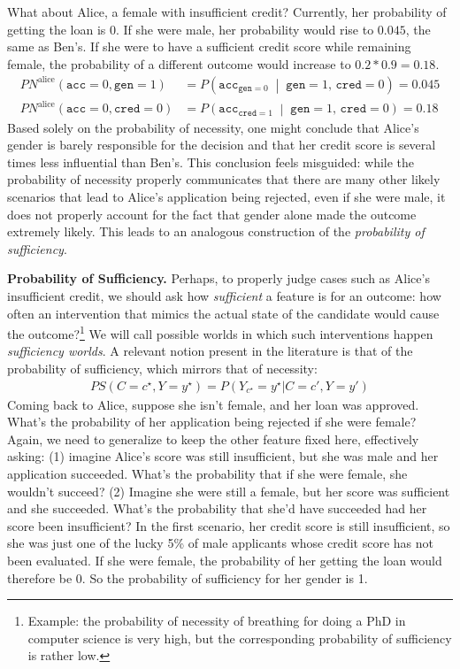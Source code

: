\documentclass[twoside,11pt]{article}
\begin{document}
What about Alice, a female with insufficient credit? Currently, her probability of getting the loan is $0$. If she were male, her probability would rise to $0.045$, the same as Ben's. If she were to have a sufficient credit score while remaining female, the probability of a different outcome would increase to $0.2 * 0.9 = 0.18$.
\begin{align*}
\mathit{PN}^{\text{alice}}(\mathtt{acc} = 0, \mathtt{gen} = 1) 
  &= P\!\left(
      \mathtt{acc}_{\mathtt{gen} = 0} \;\middle|\;
      \mathtt{gen} = 1,\, \mathtt{cred} = 0
    \right) = 0.045 \\
\mathit{PN}^{\text{alice}}(\mathtt{acc} = 0, \mathtt{cred} = 0) 
  &= P\!\left(
      \mathtt{acc}_{\mathtt{cred} = 1} \;\middle|\;
      \mathtt{gen} = 1,\, \mathtt{cred} = 0
    \right) = 0.18
\end{align*}
Based solely on the probability of necessity, one might conclude that Alice's gender is barely responsible for the decision and that her credit score is several times less influential than Ben's. This conclusion feels misguided: while the probability of necessity properly communicates that there are many other likely scenarios that lead to Alice's application being rejected, even if she were male, it does not properly account for the fact that gender alone made the outcome extremely likely. This leads to an analogous construction of the \emph{probability of sufficiency}.




\noindent \textbf{Probability of Sufficiency.} Perhaps, to properly judge cases such as Alice's insufficient credit, we should ask how \emph{sufficient} a feature is for an outcome: how often an intervention that mimics the actual state of the candidate would cause the outcome?\footnote{Example:  the probability of necessity of breathing for doing a PhD in computer science is very high, but the corresponding probability of sufficiency is rather low.}   We will call possible worlds in which such interventions happen \emph{sufficiency worlds}. A relevant notion present in the literature is that of the probability of sufficiency, which mirrors that of necessity:
\begin{align*} \mathit{PS}(C=c^\star, Y=y^\star) = P(Y_{c^\star} = y^\star \vert C=c', Y=y')\end{align*}
Coming back to Alice, suppose she isn't female, and her loan was approved. What's the probability of her application being rejected if she were female? Again, we need to generalize to keep the other feature fixed here, effectively asking: (1) imagine Alice's score was still insufficient, but she was male and her application succeeded. What's the probability that if she were female, she wouldn't succeed? (2) Imagine she were still a female, but her score was sufficient and she succeeded. What's the probability that she'd have succeeded had her score been insufficient? In the first scenario, her credit score is still insufficient, so she was just one of the lucky 5\% of male applicants whose credit score has not been evaluated. If she were female, the probability of her getting the loan would therefore be 0. So the probability of sufficiency for her gender is 1.
\end{document}
